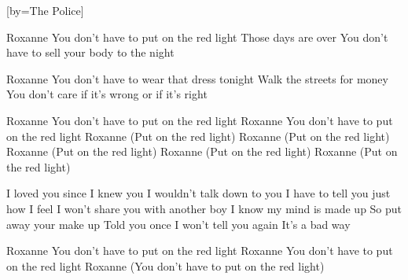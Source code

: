 [by={The Police}]

  \beginverse
  Roxanne
  You don't have to put on the red light
  Those days are over
  You don't have to sell your body to the night
  \endverse

  \beginverse
  Roxanne
  You don't have to wear that dress tonight
  Walk the streets for money
  You don't care if it's wrong or if it's right
  \endverse

  \beginchorus
  Roxanne
  You don't have to put on the red light
  Roxanne
  You don't have to put on the red light
  Roxanne (Put on the red light)
  Roxanne (Put on the red light)
  Roxanne (Put on the red light)
  Roxanne (Put on the red light)
  Roxanne (Put on the red light)
  \endchorus

  \beginverse
  I loved you since I knew you
  I wouldn't talk down to you
  I have to tell you just how I feel
  I won't share you with another boy
  I know my mind is made up
  So put away your make up
  Told you once I won't tell you again
  It's a bad way
  \endverse

  \beginchorus
  Roxanne
  You don't have to put on the red light
  Roxanne
  You don't have to put on the red light
  Roxanne (You don't have to put on the red light)
  \endchorus
\endsong
